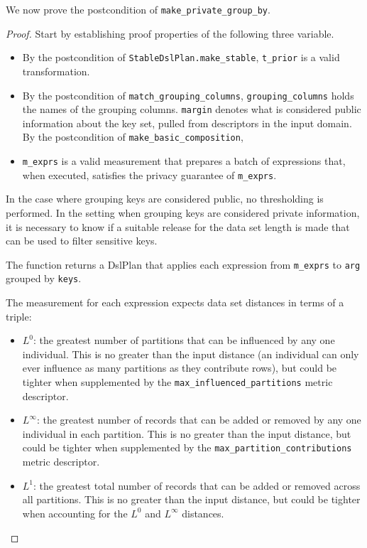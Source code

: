 \documentclass{article}
\begin{document}
We now prove the postcondition of \texttt{make\_private\_group\_by}.
\begin{proof}

Start by establishing proof properties of the following three variable.

\begin{itemize}
    \item By the postcondition of \texttt{StableDslPlan.make\_stable}, \texttt{t\_prior} is a valid transformation.
    \item By the postcondition of \texttt{match\_grouping\_columns}, \texttt{grouping\_columns} holds the names of the grouping columns.
        \texttt{margin} denotes what is considered public information about the key set, 
        pulled from descriptors in the input domain.
        By the postcondition of \texttt{make\_basic\_composition}, 
    \item \texttt{m\_exprs} is a valid measurement that prepares a batch of expressions that, 
    when executed, satisfies the privacy guarantee of \texttt{m\_exprs}.
\end{itemize}
In the case where grouping keys are considered public,
no thresholding is performed.
In the setting when grouping keys are considered private information,
it is necessary to know if a suitable release for the data set length is made
that can be used to filter sensitive keys.

The function returns a DslPlan that applies each expression from \texttt{m\_exprs}
to \texttt{arg} grouped by \texttt{keys}.

The measurement for each expression expects data set distances in terms of a triple:
\begin{itemize}
    \item $L^0$: the greatest number of partitions that can be influenced by any one individual. 
    This is no greater than the input distance (an individual can only ever influence as many partitions as they contribute rows), 
    but could be tighter when supplemented by the \texttt{max\_influenced\_partitions} metric descriptor.
    \item $L^\infty$: the greatest number of records that can be added or removed by any one individual in each partition. 
    This is no greater than the input distance, 
    but could be tighter when supplemented by the \texttt{max\_partition\_contributions} metric descriptor.
    \item $L^1$: the greatest total number of records that can be added or removed across all partitions.
    This is no greater than the input distance,
    but could be tighter when accounting for the $L^0$ and $L^\infty$ distances.
\end{itemize}


\end{proof}
\end{document}
